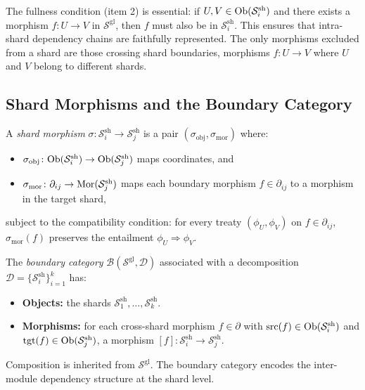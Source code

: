 \documentclass[11pt]{article}
\newcommand{\ShardSite}{\mathcal{S}^{\mathrm{sh}}}
\newcommand{\GlobalSite}{\mathcal{S}^{\mathrm{gl}}}
\begin{document}
\begin{remark}\label{rem:shard-fullness}
The fullness condition (item 2) is essential: if $U, V \in
\Ob(\ShardSite_i)$ and there exists a morphism $f\colon U \to V$ in
$\GlobalSite$, then $f$ must also be in $\ShardSite_i$.  This ensures
that intra-shard dependency chains are faithfully represented.  The
only morphisms excluded from a shard are those crossing shard
boundaries, \ie morphisms $f\colon U \to V$ where $U$ and $V$ belong
to different shards.
\end{remark}

\subsection{Shard Morphisms and the Boundary Category}

\begin{definition}\label{def:shard-morphism}
A \emph{shard morphism} $\sigma\colon \ShardSite_i \to \ShardSite_j$
is a pair $(\sigma_{\mathrm{obj}}, \sigma_{\mathrm{mor}})$ where:
\begin{itemize}[noitemsep]
  \item $\sigma_{\mathrm{obj}}\colon \Ob(\ShardSite_i) \to
        \Ob(\ShardSite_j)$ maps coordinates, and
  \item $\sigma_{\mathrm{mor}}\colon \partial_{ij} \to
        \Mor(\ShardSite_j)$ maps each boundary morphism $f \in
        \partial_{ij}$ to a morphism in the target shard,
\end{itemize}
subject to the compatibility condition: for every treaty
$(\phi_U, \phi_V)$ on $f \in \partial_{ij}$,
$\sigma_{\mathrm{mor}}(f)$ preserves the entailment $\phi_U \Rightarrow
\phi_V$.
\end{definition}

\begin{definition}\label{def:boundary-cat}
The \emph{boundary category} $\mathcal{B}(\GlobalSite, \mathcal{D})$
associated with a decomposition $\mathcal{D} = \{\ShardSite_i\}_{i=1}^k$
has:
\begin{itemize}[noitemsep]
  \item \textbf{Objects:} the shards $\ShardSite_1, \ldots,
        \ShardSite_k$.
  \item \textbf{Morphisms:} for each cross-shard morphism $f \in
        \partial$ with $\mathrm{src}(f) \in \Ob(\ShardSite_i)$ and
        $\mathrm{tgt}(f) \in \Ob(\ShardSite_j)$, a morphism
        $[f]\colon \ShardSite_i \to \ShardSite_j$.
\end{itemize}
Composition is inherited from $\GlobalSite$.  The boundary category
encodes the inter-module dependency structure at the shard level.
\end{definition}
\end{document}
